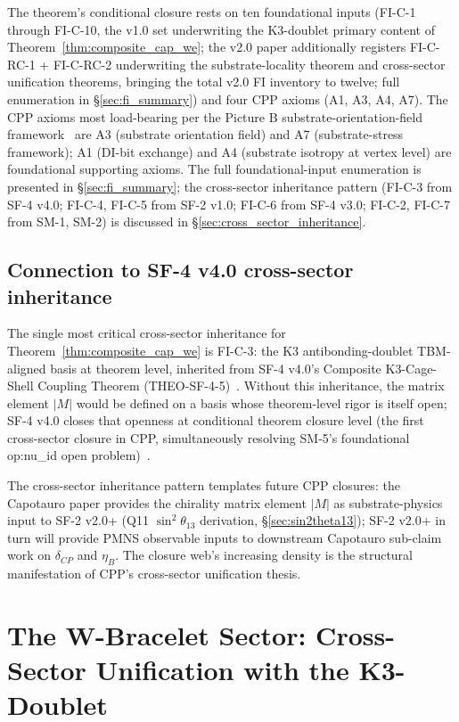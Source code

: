 \documentclass[11pt,letterpaper]{article}
\begin{document}
The theorem's conditional closure rests on ten foundational inputs (FI-C-1 through FI-C-10, the v1.0 set underwriting the K3-doublet primary content of Theorem~\ref{thm:composite_cap_we}; the v2.0 paper additionally registers FI-C-RC-1 + FI-C-RC-2 underwriting the substrate-locality theorem and cross-sector unification theorems, bringing the total v2.0 FI inventory to twelve; full enumeration in \S\ref{sec:fi_summary}) and four CPP axioms (A1, A3, A4, A7). The CPP axioms most load-bearing per the Picture B substrate-orientation-field framework~\cite{abshier_capotauro_closure_sketch} are A3 (substrate orientation field) and A7 (substrate-stress framework); A1 (DI-bit exchange) and A4 (substrate isotropy at vertex level) are foundational supporting axioms. The full foundational-input enumeration is presented in \S\ref{sec:fi_summary}; the cross-sector inheritance pattern (FI-C-3 from SF-4 v4.0; FI-C-4, FI-C-5 from SF-2 v1.0; FI-C-6 from SF-4 v3.0; FI-C-2, FI-C-7 from SM-1, SM-2) is discussed in \S\ref{sec:cross_sector_inheritance}.

\subsection{Connection to SF-4 v4.0 cross-sector inheritance}\label{sec:sf4_inheritance_section}

The single most critical cross-sector inheritance for Theorem~\ref{thm:composite_cap_we} is FI-C-3: the K3 antibonding-doublet TBM-aligned basis at theorem level, inherited from SF-4 v4.0's Composite K3-Cage-Shell Coupling Theorem (THEO-SF-4-5)~\cite{abshier_sf4}. Without this inheritance, the matrix element $|M|$ would be defined on a basis whose theorem-level rigor is itself open; SF-4 v4.0 closes that openness at conditional theorem closure level (the first cross-sector closure in CPP, simultaneously resolving SM-5's foundational op:nu\_id open problem)~\cite{abshier_sf4}.

The cross-sector inheritance pattern templates future CPP closures: the Capotauro paper provides the chirality matrix element $|M|$ as substrate-physics input to SF-2 v2.0+ (Q11 $\sin^2\theta_{13}$ derivation, \S\ref{sec:sin2theta13}); SF-2 v2.0+ in turn will provide PMNS observable inputs to downstream Capotauro sub-claim work on $\delta_{CP}$ and $\eta_B$. The closure web's increasing density is the structural manifestation of CPP's cross-sector unification thesis.

\section{The W-Bracelet Sector: Cross-Sector Unification with the K3-Doublet}\label{sec:w_bracelet_sector}
\end{document}
